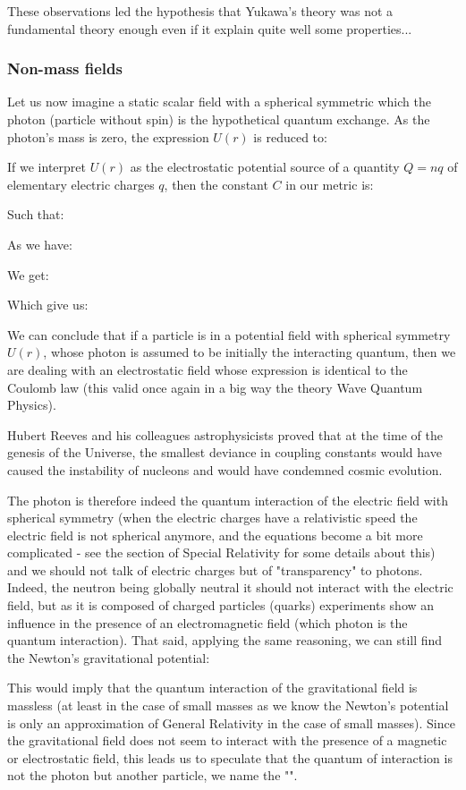 	These observations led the hypothesis that Yukawa's theory was not a fundamental theory enough even if it explain quite well some properties...

	
	\subsubsection{Non-mass fields}
	Let us now imagine a static scalar field with a spherical symmetric which the photon (particle without spin) is the hypothetical quantum exchange. As the photon's mass is zero, the expression $U (r)$ is reduced 
to:
	
	If we interpret $U (r)$ as the electrostatic potential source of a quantity $Q=nq$ of elementary electric charges $q$, then the constant $C$ in our metric is:
	
	Such that:
	
	As we have:
	
	We get:
	
	Which give us:
	
	We can conclude that if a particle is in a potential field with spherical symmetry $U (r)$, whose photon is assumed to be initially the interacting quantum, then we are dealing with an electrostatic field whose expression is identical to the Coulomb law (this valid once again in a big way the theory Wave Quantum Physics).
	\begin{tcolorbox}[title=Remark,colframe=black,arc=10pt]
	Hubert Reeves and his colleagues astrophysicists proved that at the time of the genesis of the Universe, the smallest deviance in coupling constants would have caused the instability of nucleons and would have condemned cosmic evolution.
	\end{tcolorbox}
	The photon is therefore indeed the quantum interaction of the electric field with spherical symmetry (when the electric charges have a relativistic speed the electric field is not spherical anymore, and the equations become a bit more complicated - see the section of Special Relativity for some details about this) and we should not talk of electric charges but of "transparency" to photons. Indeed, the neutron being globally neutral it should not interact with the electric field, but as it is composed of charged particles (quarks) experiments show an influence in the presence of an electromagnetic field (which photon is the quantum interaction).
	That said, applying the same reasoning, we can still find the Newton's gravitational potential:
	
	This would imply that the quantum interaction of the gravitational field is massless (at least in the case of small masses as we know the Newton's potential  is only an approximation of General Relativity in the case of small masses). Since the gravitational field does not seem to interact with the presence of a magnetic or electrostatic field, this leads us to speculate that the quantum of interaction is not the photon but another particle, we name the "".
	
